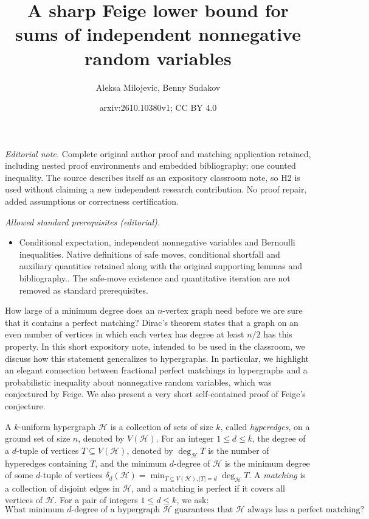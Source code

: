 \documentclass[10pt,a4paper]{article}
\title{A sharp Feige lower bound for sums of independent nonnegative random variables}
\author{Aleksa Milojevic, Benny Sudakov}
\date{arxiv:2610.10380v1; CC BY 4.0}
\newcommand{\cH}{\mathcal{H}}
\begin{document}
\maketitle
\noindent\textit{Editorial note.} Complete original author proof and matching application retained, including nested proof environments and embedded bibliography; one counted inequality. The source describes itself as an expository classroom note, so H2 is used without claiming a new independent research contribution. No proof repair, added assumptions or correctness certification.\par\medskip
\noindent\textit{Allowed standard prerequisites (editorial).}\begin{itemize}
\item Conditional expectation, independent nonnegative variables and Bernoulli inequalities. Native definitions of safe moves, conditional shortfall and auxiliary quantities retained along with the original supporting lemmas and bibliography.. The safe-move existence and quantitative iteration are not removed as standard prerequisites.
\end{itemize}\medskip
How large of a minimum degree does an $n$-vertex graph need before we are sure that it contains a perfect matching? Dirac's theorem states that a graph on an even number of vertices in which each vertex has degree at least $n/2$ has this property. In this short expository note, intended to be used in the classroom, we discuss how this statement generalizes to hypergraphs. In particular, we highlight an elegant connection between fractional perfect matchings in hypergraphs and a probabilistic inequality about nonnegative random variables, which was conjectured by Feige. We also present a very short self-contained proof of Feige's conjecture. 

A $k$-uniform hypergraph $\cH$ is a collection of sets of size $k$, called \textit{hyperedges}, on a ground set of size $n$, denoted by $V(\cH)$. For an integer $1\leq d\leq k$, the degree of a $d$-tuple of vertices $T\subseteq V(\cH)$, denoted by $\deg_\cH T$ is the number of hyperedges containing $T$, and the minimum $d$-degree of $\cH$ is the minimum degree of some $d$-tuple of vertices $\delta_d(\cH)=\min_{T\subseteq V(\cH), |T|=d} \deg_\cH T$. A \textit{matching} is a collection of disjoint edges in $\cH$, and a matching is perfect if it covers all vertices of $\cH$. For a pair of integers $1\leq d\leq k$, we ask:
\vspace{-0.2cm}
\[\text{What minimum $d$-degree of a hypergraph $\cH$ guarantees that $\cH$ always has a perfect matching?} \] 
\vspace{-0.8cm}
\end{document}
